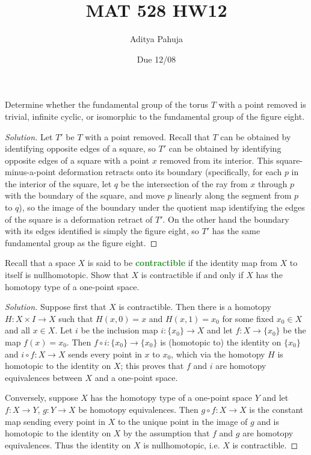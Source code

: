 \documentclass[10pt]{article}
\title{MAT 528 HW12}
\author{\large Aditya Pahuja}
\date{\large Due 12/08}
\newenvironment{soln}{\begin{proof}[Solution]}{\end{proof}}
\providecommand{\vocab}[1]{{\textbf{\textcolor{ForestGreen}{#1}}}}
\begin{document}
\maketitle

\begin{problem}
    [Munkres 58.2b]
    Determine whether the fundamental group of
    the torus $T$ with a point removed
    is trivial, infinite cyclic, or isomorphic to
    the fundamental group of the figure eight.
\end{problem}

\begin{soln}
    Let $T'$ be $T$ with a point removed.
    Recall that $T$ can be obtained by identifying opposite edges
    of a square, so $T'$ can be obtained by identifying opposite edges of
    a square with a point $x$ removed from its interior.
    This square-minus-a-point deformation retracts onto its boundary
    (specifically, for each $p$ in the interior of the square,
    let $q$ be the intersection of the ray from $x$ through $p$
    with the boundary of the square, and move $p$ linearly along
    the segment from $p$ to $q$),
    so the image of the boundary under the quotient map
    identifying the edges of the square
    is a deformation retract of $T'$. On the other hand
    the boundary with its edges identified is simply the figure eight,
    so $T'$ has the same fundamental group
    as the figure eight.
\end{soln}

\begin{problem}
    [Munkres 58.5]
    Recall that a space $X$ is said to be \vocab{contractible} if
    the identity map from $X$ to itself is nullhomotopic.
    Show that $X$ is contractible if and only if $X$ has
    the homotopy type of a one-point space.
\end{problem}

\begin{soln}
    Suppose first that $X$ is contractible.
    Then there is a homotopy $H\colon X\times I\to X$
    such that $H(x,0) = x$ and $H(x,1) =x_0$ for some fixed $x_0\in X$
    and all $x\in X$. Let $i$ be the inclusion map $i\colon\{x_0\}\to X$
    and let $f\colon X\to\{x_0\}$ be the map $f(x) = x_0$.
    Then $f\circ i\colon\{x_0\}\to\{x_0\}$ is (homotopic to) the identity on $\{x_0\}$
    and $i\circ f\colon X\to X$ sends every point in $x$ to $x_0$,
    which via the homotopy $H$ is homotopic to the identity on $X$;
    this proves that $f$ and $i$ are homotopy equivalences between $X$
    and a one-point space.

    Conversely, suppose $X$ has the homotopy type of a one-point space $Y$
    and let $f\colon X\to Y$, $g\colon Y\to X$ be homotopy equivalences.
    Then $g\circ f\colon X\to X$ is the constant map sending
    every point in $X$ to the unique point in the image of $g$
    and is homotopic to the identity on $X$ by the assumption
    that $f$ and $g$ are homotopy equivalences.
    Thus the identity on $X$ is nullhomotopic, i.e. $X$ is contractible.
\end{soln}
\end{document}
